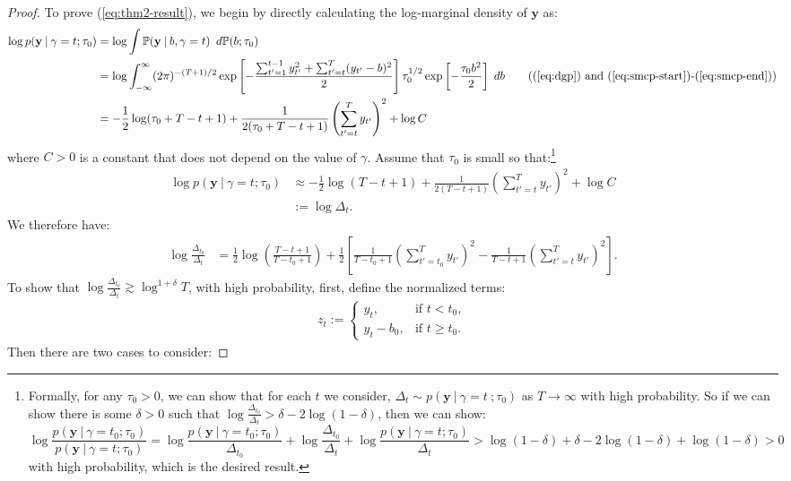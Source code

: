 \begin{proof}
To prove (\ref{eq:thm2-result}), we begin by directly calculating the log-marginal density of $\mathbf{y}$ as: 
\begin{align*}
    \log p(\mathbf{y} \:|\:\gamma = t ; \tau_0) &= \log \int \mathbb{P}(\mathbf{y} \:|\:b,\gamma = t) \:\; d\mathbb{P}(b;\tau_0) \\
    &= \log \int_{-\infty}^\infty (2\pi)^{-(T+1)/2} \exp\left[-\frac{\sum_{t'=1}^{t-1} y_{t'}^2 + \sum_{t'=t}^{T} (y_{t'} - b)^2}{2}\right] \tau_0^{1/2}\exp\left[-\frac{\tau_0 b^2}{2}\right] \; db \tag{(\ref{eq:dgp}) and (\ref{eq:smcp-start})-(\ref{eq:smcp-end})} \\
    &= -\frac{1}{2}\log(\tau_0 + T - t + 1) + \frac{1}{2(\tau_0 + T-t+1)}\left(\sum_{t'=t}^{T} y_{t'}\right)^2 + \log C
\end{align*}
where $C>0$ is a constant that does not depend on the value of $\gamma$. Assume that $\tau_0$ is small so that:\footnote{Formally, for any $\tau_0 >0$, we can show that for each $t$ we consider, $\Delta_t \sim p(\mathbf{y} \:|\:\gamma = t \:; \tau_0)$ as $T \to \infty$ with high probability. So if we can show there is some $\delta > 0$ such that $\log \frac{\Delta_{t_0}}{\Delta_t} > \delta-2\log(1-\delta)$, then we can show: $$\log \frac{p(\mathbf{y} \:|\:\gamma = t_0 ; \tau_0)}{p(\mathbf{y} \:|\:\gamma = t ; \tau_0)} = \log\frac{p(\mathbf{y} \:|\:\gamma = t_0 ; \tau_0)}{\Delta_{t_0}} + \log \frac{\Delta_{t_0}}{\Delta_t} + \log \frac{p(\mathbf{y} \:|\:\gamma = t ; \tau_0)}{\Delta_t} > \log(1-\delta) + \delta-2\log(1-\delta) +\log(1-\delta) > 0$$ with high probability, which is the desired result.} 
\begin{align*}
    \log p(\mathbf{y} \:|\: \gamma = t; \tau_0) &\approx -\frac{1}{2}\log(T - t + 1) + \frac{1}{2(T-t+1)}\left(\sum_{t'=t}^{T} y_{t'}\right)^2 + \log C \\
    &:= \log \Delta_t.
\end{align*}
We therefore have:
\begin{align*}
    \log \frac{\Delta_{t_0}}{\Delta_t} &= \frac{1}{2} \log \left(\frac{T-t+1}{T-t_0+1}\right) + \frac{1}{2} \left[\frac{1}{T-t_0+1}\left(\sum_{t'=t_0}^{T} y_{t'}\right)^2- \frac{1}{T-t+1}\left(\sum_{t'=t}^{T} y_{t'}\right)^2\right].
\end{align*}
To show that $\log \frac{\Delta_{t_0}}{\Delta_t} \gtrsim \log^{1+\delta} T$, with high probability, first, define the normalized terms:
\begin{align*}
    z_{t} :=
    \begin{cases}
        y_t, & \text{if } t < t_0, \\
        y_t - b_0, & \text{if } t \geq t_0.
    \end{cases}
\end{align*}
Then there are two cases to consider:


\end{proof}
